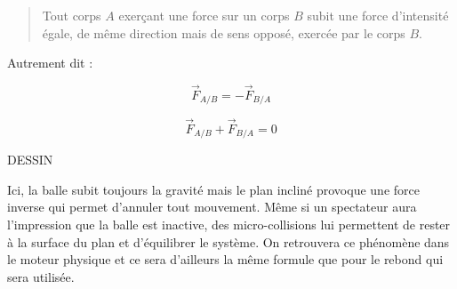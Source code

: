 \begin{quote}
Tout corps $A$ exerçant une force sur un corps $B$ subit une force d'intensité égale, de même direction mais de sens opposé, exercée par le corps $B$.
\end{quote}

Autrement dit :

\[
\vec{F}_{A/B} = -\vec{F}_{B/A}
\]

\[
\vec{F}_{A/B} + \vec{F}_{B/A} = 0
\]

DESSIN

Ici, la balle subit toujours la gravité mais le plan incliné provoque une force inverse qui permet d'annuler tout mouvement. Même si un spectateur aura l'impression que la balle est inactive, des micro-collisions lui permettent de rester à la surface du plan et d'équilibrer le système. On retrouvera ce phénomène dans le moteur physique et ce sera d'ailleurs la même formule que pour le rebond qui sera utilisée.
